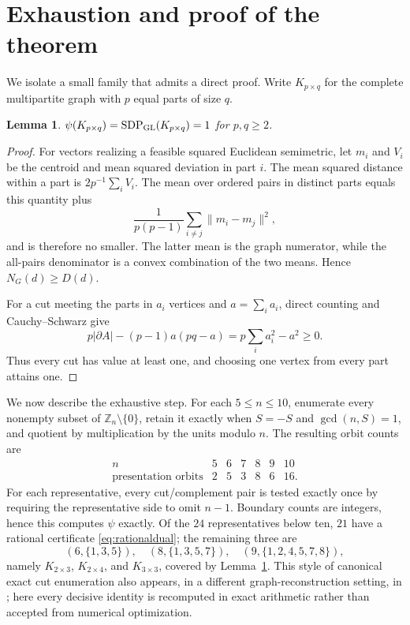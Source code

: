 \documentclass[11pt]{article}
\newtheorem{lemma}[theorem]{Lemma}
\DeclareMathOperator{\SDP}{SDP}
\begin{document}
\section{Exhaustion and proof of the theorem}

We isolate a small family that admits a direct proof.  Write $K_{p\times q}$
for the complete multipartite graph with $p$ equal parts of size $q$.

\begin{lemma}\label{lem:multipartite}
$\psi(K_{p\times q})=\SDP_{\rm GL}(K_{p\times q})=1$ for $p,q\geq2$.
\end{lemma}

\begin{proof}
For vectors realizing a feasible squared Euclidean semimetric, let $m_i$ and
$V_i$ be the centroid and mean squared deviation in part $i$.  The mean
squared distance within a part is $2p^{-1}\sum_iV_i$.  The mean over ordered
pairs in distinct parts equals this quantity plus
\[
 \frac1{p(p-1)}\sum_{i\ne j}\|m_i-m_j\|^2,
\]
and is therefore no smaller.  The latter mean is the graph numerator, while
the all-pairs denominator is a convex combination of the two means.  Hence
$N_G(d)\geq D(d)$.

For a cut meeting the parts in $a_i$ vertices and $a=\sum_i a_i$, direct
counting and Cauchy--Schwarz give
\[
 p|\partial A|-(p-1)a(pq-a)=p\sum_i a_i^2-a^2\geq0.
\]
Thus every cut has value at least one, and choosing one vertex from every part
attains one.
\end{proof}

We now describe the exhaustive step.  For each $5\leq n\leq10$, enumerate
every nonempty subset of $\mathbb Z_n\setminus\{0\}$, retain it exactly when
$S=-S$ and $\gcd(n,S)=1$, and quotient by multiplication by the units modulo
$n$.  The resulting orbit counts are
\[
\begin{array}{c|rrrrrr}
n&5&6&7&8&9&10\\ \hline
\text{presentation orbits}&2&5&3&8&6&16.
\end{array}
\]
For each representative, every cut/complement pair is tested exactly once by
requiring the representative side to omit $n-1$.  Boundary counts are
integers, hence this computes $\psi$ exactly.  Of the $24$ representatives
below ten, $21$ have a rational certificate
\eqref{eq:rationaldual}; the remaining three are
\[
(6,\{1,3,5\}),\quad (8,\{1,3,5,7\}),\quad
(9,\{1,2,4,5,7,8\}),
\]
namely $K_{2\times3}$, $K_{2\times4}$, and $K_{3\times3}$, covered by
Lemma~\ref{lem:multipartite}.  This style of canonical exact cut enumeration
also appears, in a different graph-reconstruction setting, in
\cite{Zeng2026Multiplicity}; here every decisive identity is recomputed in
exact arithmetic rather than accepted from numerical optimization.
\end{document}
